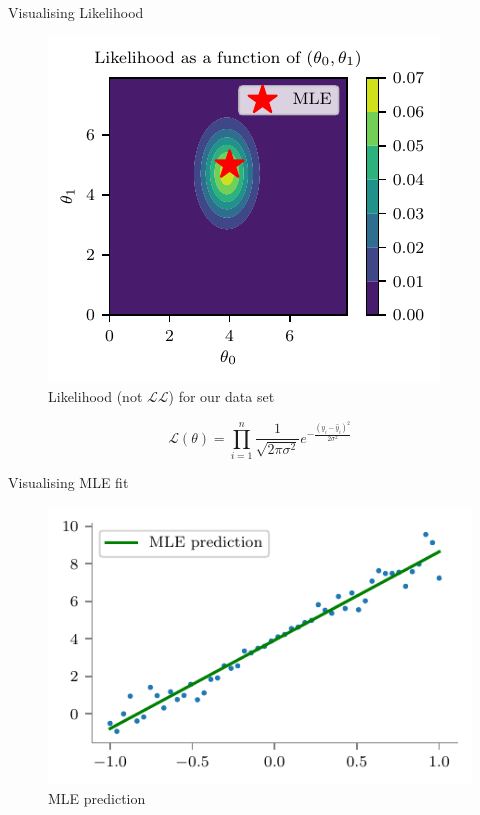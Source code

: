 \documentclass{beamer}
\begin{document}
\begin{frame}{Visualising Likelihood}
\begin{figure}
	\centering
	\includegraphics{../../notebooks/bayesian-linear-mle-likelihood}
	\caption{Likelihood (not $\mathcal{LL}$) for our data set}
	\label{fig:bayesian-linear-dataset}
\end{figure}
\vspace{-20pt}
\pause $$
\mathcal{L}(\theta) = \prod_{i=1}^{n} \frac{1}{\sqrt{2 \pi \sigma^{2}}} e^{-\frac{(y_{i}-\hat{y}_{i})^{2}}{2 \sigma^{2}}}
$$
\end{frame}

\begin{frame}{Visualising MLE fit}
\begin{figure}
	\centering
	\includegraphics{../../notebooks/mle-prediction}
	\caption{MLE prediction}
	\label{fig:bayesian-linear-dataset}
\end{figure}
\end{frame}
\end{document}
